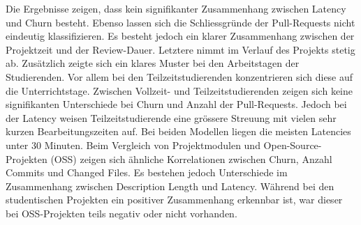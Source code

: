 \begin{extraAbstract}
 Die Ergebnisse zeigen, dass kein signifikanter Zusammenhang zwischen Latency und Churn besteht. Ebenso lassen sich die Schliessgründe der Pull-Requests nicht eindeutig klassifizieren. Es besteht jedoch ein klarer Zusammenhang zwischen der Projektzeit und der Review-Dauer. Letztere nimmt im Verlauf des Projekts stetig ab. Zusätzlich zeigte sich ein klares Muster bei den Arbeitstagen der Studierenden. Vor allem bei den Teilzeitstudierenden konzentrieren sich diese auf die Unterrichtstage. Zwischen Vollzeit- und Teilzeitstudierenden zeigen sich keine signifikanten Unterschiede bei Churn und Anzahl der Pull-Requests. Jedoch bei der Latency weisen Teilzeitstudierende eine grössere Streuung mit vielen sehr kurzen Bearbeitungszeiten auf. Bei beiden Modellen liegen die meisten Latencies unter 30 Minuten.
 Beim Vergleich von Projektmodulen und Open-Source-Projekten (OSS) zeigen sich ähnliche Korrelationen zwischen Churn, Anzahl Commits und Changed Files. Es bestehen jedoch Unterschiede im Zusammenhang zwischen Description Length und Latency. Während bei den studentischen Projekten ein positiver Zusammenhang erkennbar ist, war dieser bei OSS-Projekten teils negativ oder nicht vorhanden.
 

\end{extraAbstract}
